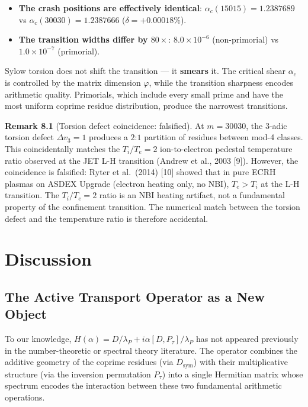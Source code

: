 \documentclass[11pt,letterpaper]{article}
\theoremstyle{definition}
\theoremstyle{remark}
\begin{document}
\begin{itemize}
\item
  \textbf{The crash positions are effectively identical}: $\alpha_c(15015) = 1.2387689$ vs $\alpha_c(30030) = 1.2387666$ ($\delta = +0.00018\%$).
\item
  \textbf{The transition widths differ by $80\times$}: $8.0 \times 10^{-6}$ (non-primorial) vs $1.0 \times 10^{-7}$ (primorial).
\end{itemize}

Sylow torsion does not shift the transition --- it \textbf{smears} it. The critical shear $\alpha_c$ is controlled by the matrix dimension $\varphi$, while the transition sharpness encodes arithmetic quality. Primorials, which include every small prime and have the most uniform coprime residue distribution, produce the narrowest transitions.

\textbf{Remark 8.1} (Torsion defect coincidence: falsified). At $m = 30030$, the 3-adic torsion defect $\Delta v_3 = 1$ produces a $2$:$1$ partition of residues between mod-4 classes. This coincidentally matches the $T_i/T_e = 2$ ion-to-electron pedestal temperature ratio observed at the JET L-H transition (Andrew et al., 2003 [9]). However, the coincidence is falsified: Ryter et al.~(2014) [10] showed that in pure ECRH plasmas on ASDEX Upgrade (electron heating only, no NBI), $T_e > T_i$ at the L-H transition. The $T_i/T_e = 2$ ratio is an NBI heating artifact, not a fundamental property of the confinement transition. The numerical match between the torsion defect and the temperature ratio is therefore accidental.

\section{Discussion}\label{discussion}

\subsection{The Active Transport Operator as a New Object}\label{the-active-transport-operator-as-a-new-object}

To our knowledge, $H(\alpha) = D/\lambda_P + i\alpha [D, P_\tau]/\lambda_P$ has not appeared previously in the number-theoretic or spectral theory literature. The operator combines the additive geometry of the coprime residues (via $D_{\text{sym}}$) with their multiplicative structure (via the inversion permutation $P_\tau$) into a single Hermitian matrix whose spectrum encodes the interaction between these two fundamental arithmetic operations.
\end{document}
